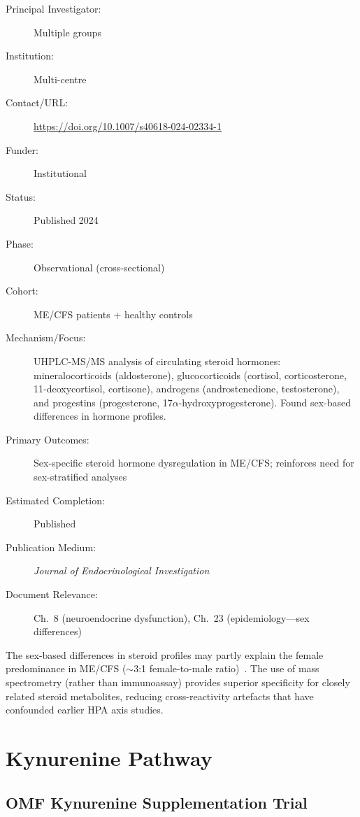 \begin{description}
    \item[Principal Investigator:] Multiple groups
    \item[Institution:] Multi-centre
    \item[Contact/URL:] \url{https://doi.org/10.1007/s40618-024-02334-1}
    \item[Funder:] Institutional
    \item[Status:] Published 2024
    \item[Phase:] Observational (cross-sectional)
    \item[Cohort:] ME/CFS patients + healthy controls
    \item[Mechanism/Focus:] UHPLC-MS/MS analysis of circulating steroid
        hormones: mineralocorticoids (aldosterone), glucocorticoids
        (cortisol, corticosterone, 11-deoxycortisol, cortisone), androgens
        (androstenedione, testosterone), and progestins (progesterone,
        17$\alpha$-hydroxyprogesterone).  Found sex-based differences in
        hormone profiles.
    \item[Primary Outcomes:] Sex-specific steroid hormone dysregulation in
        ME/CFS; reinforces need for sex-stratified analyses
    \item[Estimated Completion:] Published
    \item[Publication Medium:] \textit{Journal of Endocrinological
        Investigation}
    \item[Document Relevance:] Ch.~8 (neuroendocrine dysfunction), Ch.~23
        (epidemiology---sex differences)
\end{description}

The sex-based differences in steroid profiles may partly explain the
female predominance in ME/CFS ($\sim$3:1 female-to-male
ratio)~\cite{pipper2024steroid}.  The use of mass spectrometry
(rather than immunoassay) provides superior specificity for closely related
steroid metabolites, reducing cross-reactivity artefacts that have
confounded earlier HPA axis studies.

\section{Kynurenine Pathway}
\label{sec:registry-kynurenine}

\subsection{OMF Kynurenine Supplementation Trial}
\label{sec:registry-kynurenine-trial}

